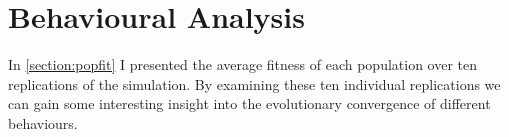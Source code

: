 \documentclass[12pt,a4paper]{report}
\begin{document}

\section{Behavioural Analysis}\label{section:behaviouranalysis}


In \cref{section:popfit} I presented the average fitness of each population over ten replications of the simulation. By examining these ten individual replications we can gain some interesting insight into the evolutionary convergence of different behaviours.
\end{document}
